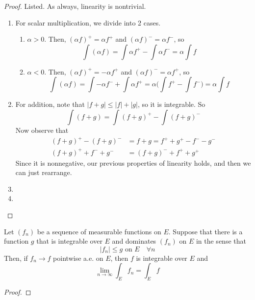  \begin{proof}
    Listed. As always, linearity is nontrivial. 
    \begin{enumerate}
      \item For scalar multiplication, we divide into 2 cases. 
        \begin{enumerate}
          \item $\alpha > 0$. Then, $(\alpha f)^+ = \alpha f^+$ and $(\alpha f)^- = \alpha f^-$, so 
            \begin{equation}
              \int (\alpha f) = \int \alpha f^+ - \int \alpha f^- = \alpha \int f
            \end{equation}

          \item $\alpha < 0$. Then, $(\alpha f)^+ = - \alpha f^+$ and $(\alpha f)^- = \alpha f^+$, so 
            \begin{equation}
              \int (\alpha f) = \int -\alpha f^- + \int \alpha f^+ = \alpha \bigg( \int f^+ - \int f^- \bigg) = \alpha \int f
            \end{equation}
        \end{enumerate}
      \item For addition, note that $|f + g| \leq |f| + |g|$, so it is integrable. So 
        \begin{equation}
          \int (f + g) = \int (f + g)^+ - \int (f + g)^- 
        \end{equation}
        Now observe that 
        \begin{align}
          (f + g)^+ - (f + g)^- & = f + g = f^+ + g^+ - f^- - g^- \\ 
          (f + g)^+ + f^- + g^- & = (f + g)^- + f^+ + g^+ 
        \end{align}
        Since it is nonnegative, our previous properties of linearity holds, and then we can just rearrange. 
      \item 
      \item 
    \end{enumerate}
  \end{proof}

  \begin{theorem}
    Let $(f_n)$ be a sequence of measurable functions on $E$. Suppose that there is a function $g$ that is integrable over $E$ and dominates $(f_n)$ on $E$ in the sense that 
    \begin{equation}
      |f_n| \leq g \text{ on } E \quad \forall n
    \end{equation}
    Then, if $f_n \to f$ pointwise a.e. on $E$, then $f$ is integrable over $E$ and 
    \begin{equation}
      \lim_{n \to \infty} \int_E f_n = \int_E f
    \end{equation}
  \end{theorem}
  \begin{proof}
    
  \end{proof}

